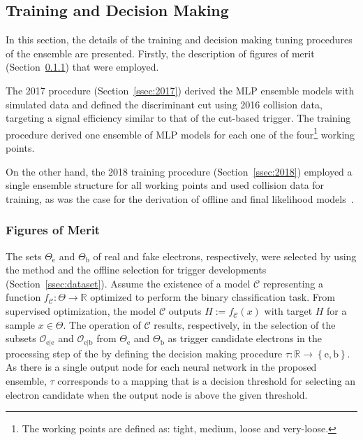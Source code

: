 \subsection{Training and Decision Making}%
\label{sec:tuning}

In this section, the details of the training and decision making tuning procedures
of the \rnn ensemble are presented. Firstly, the description of figures of merit (Section~\ref{ssec:fom}) that were employed.

The 2017 procedure (Section~\ref{ssec:2017}) derived the MLP ensemble
models with simulated data and defined the discriminant cut using
2016 collision data, targeting a signal efficiency similar to that of the cut-based trigger.
The training procedure derived one ensemble of MLP models for each one of the four\footnote{The working points are defined as: tight, medium, loose and very-loose.} working points. 

On the other hand, the 2018 training procedure (Section~\ref{ssec:2018})
employed a single ensemble structure for all working points and used
collision data for training, as was the case for the derivation of offline
and final \hlt likelihood models~\cite{aaboud2019electron}.





\subsubsection{Figures of Merit}\label{ssec:fom}



The sets $\Theta_{\text{e}}$ and $\Theta_{\text{b}}$ of real and fake electrons, respectively, were selected by using the \tnp{} method and the offline selection for trigger developments (Section~\ref{ssec:dataset}). Assume the existence of a model $\mathcal{C}$ representing a function $f_{\mathcal{C}} : \Theta \rightarrow \mathbb{R}$ optimized to perform the binary classification task.   From supervised optimization, the model $\mathcal{C}$ outputs $\hat{H}:=f_{\mathcal{C}}(x)$ with target $H$ for a sample $x \in \Theta$. The operation of $\mathcal{C}$ results, respectively, in the selection of the subsets $\mathcal{O}_{\text{e}|\text{e}}$ and $\mathcal{O}_{\text{e}|\text{b}}$ from $\Theta_{\text{e}}$ and $\Theta_{\text{b}}$ as trigger candidate electrons in the \fastcalo{} processing step of the \hlt{} by defining the decision making procedure $\tau : \mathbb{R} \rightarrow \left\{\text{e},\text{b}\right\}$. As there is a single output node for each neural network in the proposed \rnn{} ensemble, $\tau$ corresponds to a mapping that is a decision threshold for selecting an electron candidate when the output node is above the given threshold.  



